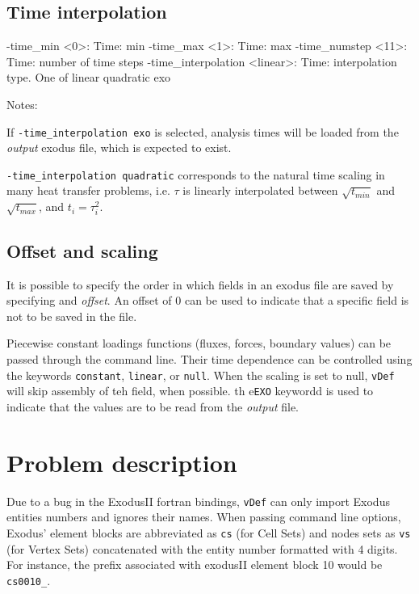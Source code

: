 \documentclass[10pt,oneside]{memoir}
\def\vDef{{\texttt{vDef}} }
\begin{document}
\subsection{Time interpolation}
\small{
\begin{boxedverbatim}
-time_min <0>: Time: min 
-time_max <1>: Time: max 
-time_numstep <11>: Time: number of time steps 
-time_interpolation <linear>: Time: interpolation type. One of linear quadratic exo
\end{boxedverbatim}
}
Notes: 
\begin{compactenum}
	\item If \verb+-time_interpolation exo+ is selected, analysis times will be loaded from the \emph{output} exodus file, which is expected to exist.
	\item \verb+-time_interpolation quadratic+ corresponds to the natural time scaling in many heat transfer problems, i.e. $\tau$ is linearly interpolated between $\sqrt{t_{min}}$ and $\sqrt{t_{max}}$, and $t_i = \tau_i^2$.
\end{compactenum}

\subsection{Offset and scaling}
It is possible to specify the order in which fields in an exodus file are saved by specifying and \emph{offset}. An offset of 0 can be used to indicate that a specific field is not to be saved in the file.

Piecewise constant loadings functions (fluxes, forces, boundary values) can be passed through the command line. Their time dependence can be controlled using the keywords \verb+constant+, \verb+linear+, or \verb+null+. When the scaling is set to null, \vDef will skip assembly of teh field, when possible. th e\verb+EXO+ keywordd is used to indicate that the values are to be read from the \emph{output} file.

\section{Problem description}
Due to a bug in the ExodusII fortran bindings, \vDef can only import Exodus entities numbers and ignores their names. When passing command line options, Exodus' element blocks are abbreviated as \verb+cs+ (for Cell Sets) and nodes sets as \verb+vs+ (for Vertex Sets) concatenated with the entity number formatted with 4 digits. For instance, the prefix associated with exodusII element block 10 would be \verb+cs0010_+.
\end{document}
